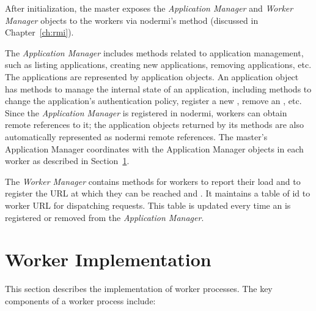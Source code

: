 After initialization, the master exposes the \emph{Application Manager} and
\emph{Worker Manager} objects to the workers via nodermi's  method
(discussed in Chapter~\ref{ch:rmi}).

The \emph{Application Manager} includes methods related to application management,
such as listing applications, creating new applications, removing applications,
etc.  The applications are represented by application objects. An application
object has methods to manage the internal state of an application, including
methods to change the application's authentication policy, register a new \appins, 
remove an \appins, etc.  Since the \emph{Application Manager} is registered in nodermi,
workers can obtain remote references to it; the application objects returned by its
methods are also automatically represented as nodermi remote references.
The master's Application Manager coordinates with the Application Manager
objects in each worker as described in Section~\ref{sec:worker}.

The \emph{Worker Manager} contains methods for workers to report their load
and to register the URL at which they can be reached and .  It maintains a
table of \appins{} id to worker URL for dispatching requests.  This table is
updated every time an \appins{} is registered or removed from the
\emph{Application Manager}.

\section{Worker Implementation}
\label{sec:worker}

This section describes the implementation of worker processes.
The key components of a worker process include:


